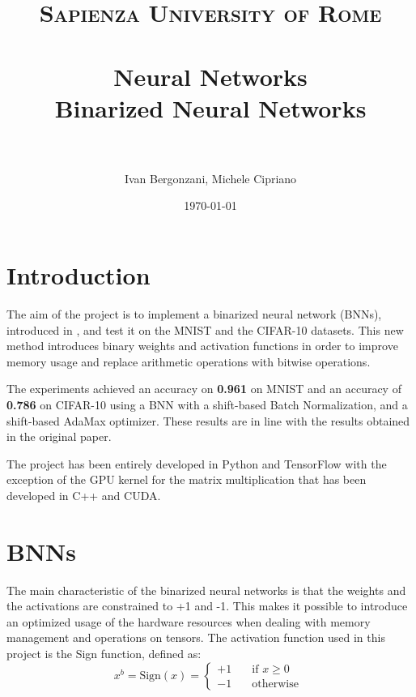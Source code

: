\documentclass[a4paper]{article}
\title{
\normalfont \normalsize
\textsc{Sapienza University of Rome} \\ [25pt] %
\horrule{0.5pt} \\[0.4cm] %
\LARGE Neural Networks \\ %
\large Binarized Neural Networks \\
\horrule{2pt} \\[0.5cm] %
}
\author{Ivan Bergonzani, Michele Cipriano} %
\date{\normalsize\today} %
\numberwithin{equation}{section} %
\numberwithin{figure}{section} %
\numberwithin{table}{section} %
\theoremstyle{definition}
\begin{document}
\sloppy %

\maketitle %


\section{Introduction}

The aim of the project is to implement a binarized 
neural network (BNNs), introduced in \cite{binarynet}, and test it on
the MNIST and the CIFAR-10 datasets. This new method 
introduces binary weights and activation functions in order to 
improve memory usage and replace arithmetic operations 
with bitwise operations.

The experiments achieved an accuracy on \textbf{0.961} on
MNIST and an accuracy of \textbf{0.786} on CIFAR-10
using a BNN with a shift-based Batch Normalization,
and a shift-based AdaMax optimizer.
These results are in line with
the results obtained in the original paper.

The project has been entirely developed in Python and 
TensorFlow with the exception of the GPU kernel for
the matrix multiplication that
has been developed in C++ and CUDA.


\section{BNNs}

The main characteristic of the binarized neural networks is
that the weights and the activations are constrained to +1
and -1. This makes it possible to introduce an optimized 
usage of the hardware resources when dealing with memory
management and operations on tensors. The activation function
used in this project is the Sign function, defined as:
\begin{equation*}
    x^b = \text{Sign}(x) =
        \begin{cases}
    	    +1 & \quad \text{if } x \ge 0\\
    		-1 & \quad \text{otherwise }
    	\end{cases}
\end{equation*}
\end{document}

